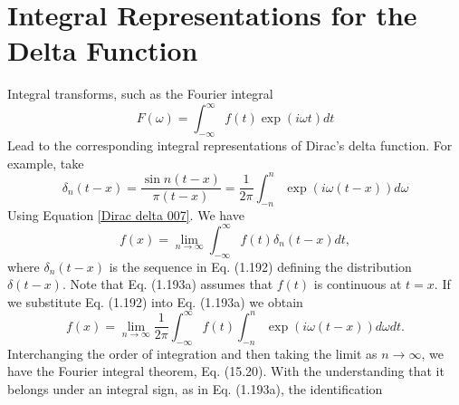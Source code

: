 \section{Integral Representations for the Delta Function}
Integral transforms, such as the Fourier integral
\begin{equation}
F(\omega)=\int_{-\infty}^{\infty} f(t) \exp (i \omega t) d t
\end{equation}
Lead to the corresponding integral representations of Dirac's delta function. For example, take
\begin{equation}
\delta_{n}(t-x)=\frac{\sin n(t-x)}{\pi(t-x)}=\frac{1}{2 \pi} \int_{-n}^{n} \exp (i \omega(t-x)) d \omega \label{Dirac delta 007}
\end{equation}
Using Equation \ref{Dirac delta 007}. We have
$$
f(x)=\lim _{n \rightarrow \infty} \int_{-\infty}^{\infty} f(t) \delta_{n}(t-x) d t,
$$
where $\delta_{n}(t-x)$ is the sequence in Eq. (1.192) defining the distribution $\delta(t-x)$. Note that Eq. (1.193a) assumes that $f(t)$ is continuous at $t=x$. If we substitute Eq. (1.192) into Eq. (1.193a) we obtain
$$
f(x)=\lim _{n \rightarrow \infty} \frac{1}{2 \pi} \int_{-\infty}^{\infty} f(t) \int_{-n}^{n} \exp (i \omega(t-x)) d \omega d t .
$$
Interchanging the order of integration and then taking the limit as $n \rightarrow \infty$, we have the Fourier integral theorem, Eq. (15.20).
With the understanding that it belongs under an integral sign, as in Eq. (1.193a), the identification

